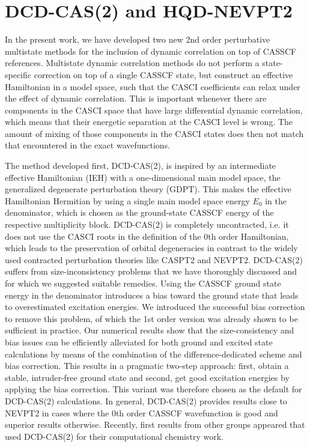 \section{DCD-CAS(2) and HQD-NEVPT2}
In the present work, we have developed two new 2nd order perturbative multistate methods for
the inclusion of dynamic correlation on top of CASSCF references. Multistate dynamic correlation methods do not perform a state-specific correction on top of a single CASSCF state, but construct an effective Hamiltonian in a model space, such that the CASCI
coefficients can relax under the effect of dynamic correlation. This is important whenever there are components in the CASCI space that have large differential dynamic correlation, which means that their energetic separation at the CASCI level is wrong. The amount of mixing of those components in the CASCI states does then not match that encountered in the exact wavefunctions.

The method developed first, DCD-CAS(2), is inspired by an intermediate effective Hamiltonian (IEH) with a one-dimensional main model space, the generalized degenerate perturbation theory (GDPT).\cite{MalriDD_1985_809} This makes the effective Hamiltonian Hermitian by using a single main model space energy $E_0$ in the denominator, which is chosen as the ground-state CASSCF energy of the respective multiplicity block. DCD-CAS(2) is completely uncontracted, i.e. it does not use the CASCI roots in the definition of the 0th order Hamiltonian, which leads to the preservation of orbital degeneracies in contrast to the widely used contracted perturbation theories like CASPT2 and NEVPT2.
DCD-CAS(2) suffers from size-inconsistency
problems that we have thoroughly discussed and for which we suggested
suitable remedies. Using the CASSCF ground state energy in
the denominator introduces a bias toward the ground state that leads to overestimated excitation energies. We introduced the successful bias correction to remove this problem, of which the 1st order version was already shown to be sufficient in practice. Our numerical results show that the size-consistency and
bias issues can be efficiently alleviated for both ground and
excited state calculations by means of the combination of the difference-dedicated
scheme and bias correction. This results in a pragmatic two-step approach: first, obtain a stable, intruder-free ground state
and second, get good excitation energies by applying the bias
correction. This variant was therefore chosen as the default for DCD-CAS(2) calculations.
In general, DCD-CAS(2) provides results
close to NEVPT2 in cases where the 0th order CASSCF wavefunction is good and superior results
otherwise. Recently, first results from other groups appeared that used DCD-CAS(2) for their computational chemistry work.\cite{AndreABCA_2019_116577, KotrlH_2019_14046}

